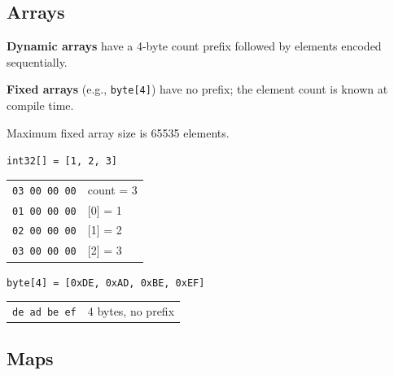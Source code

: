 \documentclass[11pt,onecolumn]{article}
\begin{document}
\subsection{Arrays}

\begin{minipage}[t]{0.48\textwidth}
\raggedright
\textbf{Dynamic arrays} have a 4-byte count prefix followed by elements encoded sequentially.

\vspace{6pt}
\textbf{Fixed arrays} (e.g., \texttt{byte[4]}) have no prefix; the element count is known at compile time.

\vspace{6pt}
Maximum fixed array size is 65535 elements.
\end{minipage}\hfill
\begin{minipage}[t]{0.48\textwidth}
\small
\texttt{int32[] = [1, 2, 3]}
\vspace{4pt}

\begin{tabular}[t]{@{}r@{\quad}l@{}}
\texttt{03 00 00 00} & count = 3 \\
\texttt{01 00 00 00} & {[0]} = 1 \\
\texttt{02 00 00 00} & {[1]} = 2 \\
\texttt{03 00 00 00} & {[2]} = 3 \\
\end{tabular}

\vspace{8pt}
\texttt{byte[4] = [0xDE, 0xAD, 0xBE, 0xEF]}
\vspace{4pt}

\begin{tabular}[t]{@{}r@{\quad}l@{}}
\texttt{de ad be ef} & 4 bytes, no prefix \\
\end{tabular}
\end{minipage}


\subsection{Maps}
\end{document}

